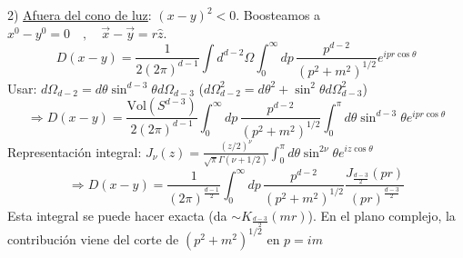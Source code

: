 2) \underline{Afuera del cono de luz}: $(x-y)^2 < 0$. Boosteamos a $x^0 - y^0 = 0 \quad , \quad \vec{x} - \vec{y} = r\hat{z}$.
$$ D(x-y) = \frac{1}{2(2\pi)^{d-1}} \int d^{d-2}\Omega \int_0^\infty dp \, \frac{p^{d-2}}{(p^2 + m^2)^{1/2}} e^{i p r \cos\theta} $$
Usar: $d\Omega_{d-2} = d\theta \sin^{d-3}\theta d\Omega_{d-3}$ ($d\Omega_{d-2}^2 = d\theta^2 + \sin^2\theta d\Omega_{d-3}^2$)
$$ \Rightarrow D(x-y) = \frac{\text{Vol}(S^{d-3})}{2(2\pi)^{d-1}} \int_0^\infty dp \, \frac{p^{d-2}}{(p^2 + m^2)^{1/2}} \int_0^\pi d\theta \sin^{d-3}\theta e^{i p r \cos\theta} $$
Representación integral: $J_\nu(z) = \frac{(z/2)^\nu}{\sqrt{\pi} \Gamma(\nu + 1/2)} \int_0^\pi d\theta \sin^{2\nu}\theta e^{i z \cos\theta}$
$$ \Rightarrow D(x-y) = \frac{1}{(2\pi)^{\frac{d-1}{2}}} \int_0^\infty dp \, \frac{p^{d-2}}{(p^2 + m^2)^{1/2}} \frac{J_{\frac{d-3}{2}}(pr)}{(pr)^{\frac{d-3}{2}}} $$
Esta integral se puede hacer exacta (da $\sim K_{\frac{d-3}{2}}(mr)$). En el plano complejo, la contribución viene del corte de $(p^2 + m^2)^{1/2}$ en $p = i m$